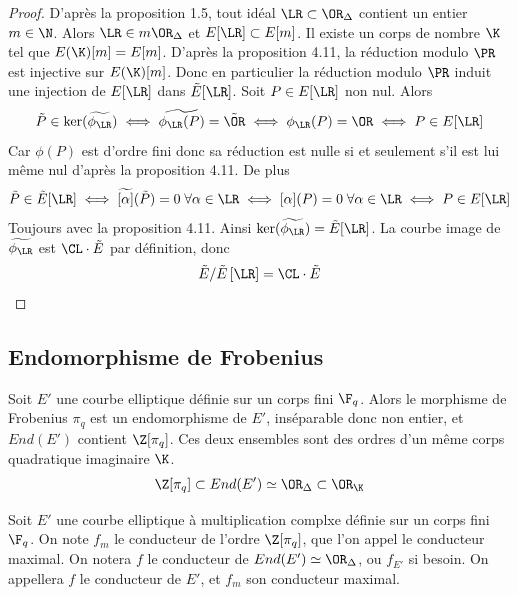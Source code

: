 \begin{proof}
	D'après la proposition 1.5, tout idéal $\LR\subset\OR_{\Delta}$ contient un entier $m\in\N$. Alors $\LR\in m\OR_{\Delta}$ et $E[\LR]\subset E[m]$. Il existe un corps de nombre $\K$ tel que $E(\K)[m] = E[m]$. D'après la proposition 4.11, la réduction modulo $\PR$ est injective sur $E(\K)[m]$. Donc en particulier la réduction modulo $\PR$ induit une injection de $E[\LR]$ dans $\tilde{E}[\LR]$. Soit $P\in E[\LR]$ non nul. Alors 
	\begin{equation*}
		\tilde{P}\in \ker(\widetilde{\phi_{\LR}}) \iff \widetilde{\phi_{\LR}(P)} = \tilde{\OR} \iff \phi_{\LR}(P) = \OR \iff P\in E[\LR]
	\end{equation*}
	Car $\phi(P)$ est d'ordre fini donc sa réduction est nulle si et seulement s'il est lui même nul d'après la proposition 4.11. De plus
	\begin{equation*}
		\tilde{P}\in \tilde{E}[\LR] \iff \widetilde{\left[ \alpha\right] }(\tilde{P}) = 0 \;\forall\alpha\in\LR \iff {\left[ \alpha\right] }(P) = 0 \;\forall\alpha\in\LR \iff P\in E[\LR]
	\end{equation*}
	Toujours avec la proposition 4.11. Ainsi $\ker(\widetilde{\phi_{\LR}}) = \tilde{E}[\LR]$. La courbe image de $\widetilde{\phi_{\LR}}$ est $\CL\cdot \tilde{E}$ par définition, donc 
	\begin{equation*}
		\tilde{E}/\tilde{E}\left[ \LR\right] = \CL\cdot \tilde{E}
	\end{equation*}
\end{proof}










\subsection{Endomorphisme de Frobenius}

Soit $E'$ une courbe elliptique définie sur un corps fini $\F_{q}$. Alors le morphisme de Frobenius $\pi_{q}$ est un endomorphisme de $E'$, inséparable donc non entier, et $End(E')$ contient $\Z[\pi_{q}]$. Ces deux ensembles sont des ordres d'un même corps quadratique imaginaire $\K$. 
\begin{equation*}
	\Z[\pi_{q}]\subset End(E')\simeq\OR_{\Delta}\subset\OR_{\K}
\end{equation*} 

\begin{Def}
	Soit $E'$ une courbe elliptique à multiplication complxe définie sur un corps fini $\F_{q}$. On note $f_{m}$ le conducteur de l'ordre $\Z[\pi_{q}]$, que l'on appel le conducteur maximal. On notera $f$ le conducteur de $End(E')\simeq\OR_{\Delta}$, ou $f_{E'}$ si besoin. On appellera $f$ le conducteur de $E'$, et $f_{m}$ son conducteur maximal. 
\end{Def}

